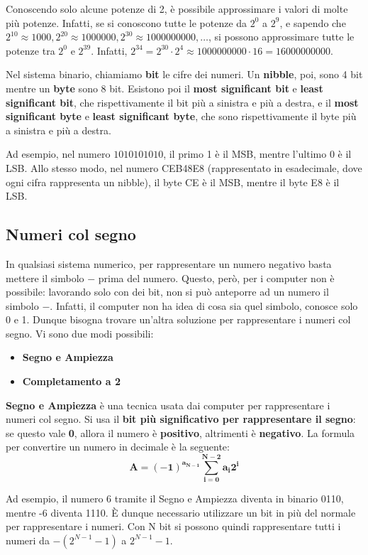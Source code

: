 \documentclass[11pt, a4paper, titlepage, oneside]{scrbook}
\begin{document}
\begin{Proprieta}[Potenze di 2]
\label{prop-potenze-2}
Conoscendo solo alcune potenze di 2, è possibile approssimare i valori di molte più potenze. Infatti, se si conoscono tutte le potenze da $2^0$ a $2^9$, e sapendo che \mbox{$2^{10} \approx 1000, 2^{20} \approx 1000000, 2^{30} \approx 1000000000, \ldots$}, si possono approssimare tutte le potenze tra $2^0$ e $2^{39}$. Infatti, $2^{34} = 2^{30} \cdot 2^4 \approx 1000000000 \cdot 16 = 16000000000$.
\end{Proprieta}

\begin{Definizione}
\label{def-definizioni-sistema-binario}
Nel sistema binario, chiamiamo \textbf{bit} le cifre dei numeri. Un \textbf{nibble}, poi, sono 4 bit mentre un \textbf{byte} sono 8 bit. Esistono poi il \textbf{most significant bit} e \textbf{least significant bit}, che rispettivamente il bit più a sinistra e più a destra, e il \textbf{most significant byte} e \textbf{least significant byte}, che sono rispettivamente il byte più a sinistra e più a destra.  
\end{Definizione}

Ad esempio, nel numero $1010101010$, il primo 1 è il MSB, mentre l'ultimo 0 è il LSB. Allo stesso modo, nel numero CEB48E8 (rappresentato in esadecimale, dove ogni cifra rappresenta un nibble), il byte CE è il MSB, mentre il byte E8 è il LSB.

\subsection{Numeri col segno}

In qualsiasi sistema numerico, per rappresentare un numero negativo basta mettere il simbolo $-$ prima del numero. Questo, però, per i computer non è possibile: lavorando solo con dei bit, non si può anteporre ad un numero il simbolo $-$. Infatti, il computer non ha idea di cosa sia quel simbolo, conosce solo 0 e 1. Dunque bisogna trovare un'altra soluzione per rappresentare i numeri col segno. Vi sono due modi possibili:
\begin{itemize}
    \item \textbf{Segno e Ampiezza}
    \item \textbf{Completamento a 2}
\end{itemize}

\begin{Proprieta}
\label{def-Segno e Ampiezza}
\textbf{Segno e Ampiezza} è una tecnica usata dai computer per rappresentare i numeri col segno. Si usa il \textbf{bit più significativo per rappresentare il segno}: se questo vale \textbf{0}, allora il numero è \textbf{positivo}, altrimenti è \textbf{negativo}. La formula per convertire un numero in decimale è la seguente:
\[
\bm{A = (-1)^{a_{N-1}} \sum_{i = 0}^{N-2} a_i 2^i}
\]
\end{Proprieta}
Ad esempio, il numero 6 tramite il Segno e Ampiezza diventa in binario 0110, mentre -6 diventa 1110. È dunque necessario utilizzare un bit in più del normale per rappresentare i numeri. Con N bit si possono quindi rappresentare tutti i numeri da $-(2^{N-1} - 1)$ a $2^{N-1} - 1$. 
\end{document}
